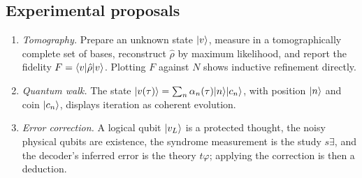 \subsection{Experimental proposals}

\begin{enumerate}
  \item \emph{Tomography.} Prepare an unknown state $\lvert v\rangle$, measure in a tomographically complete
        set of bases, reconstruct $\hat\rho$ by maximum likelihood, and report the fidelity
        $F=\langle v\rvert\hat\rho\lvert v\rangle$. Plotting $F$ against $N$ shows inductive refinement directly.
  \item \emph{Quantum walk.} The state $\lvert v(\tau)\rangle=\sum_n\alpha_n(\tau)\lvert n\rangle\lvert c_n\rangle$, with
        position $\lvert n\rangle$ and coin $\lvert c_n\rangle$, displays iteration as coherent evolution.
  \item \emph{Error correction.} A logical qubit $\lvert v_L\rangle$ is a protected thought, the noisy
        physical qubits are existence, the syndrome measurement is the study $s\exists$, and the
        decoder's inferred error is the theory $t\varphi$; applying the correction is then a
        deduction.
\end{enumerate}
